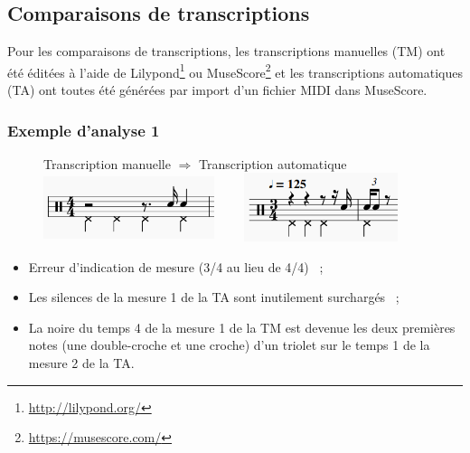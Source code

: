 \subsection*{Comparaisons de transcriptions}
Pour les comparaisons de transcriptions, les transcriptions manuelles (TM) ont
été éditées à l’aide de Lilypond\footnote{\url{http://lilypond.org/}} ou
MuseScore\footnote{\url{https://musescore.com/}} et les transcriptions
automatiques (TA) ont toutes été générées par import d’un fichier MIDI dans
MuseScore.

\subsubsection{Exemple d’analyse 1}
\begin{figure}[h]
\centering
Transcription manuelle $\Rightarrow$ Transcription automatique
\includegraphics[height=20mm, width=50mm]{
z_images/4_experimentations/1_analyses/0_drummer1_session3/1_manuelle.png}
\ \ \ \ 
\includegraphics[height=20mm, width=45mm]{
z_images/4_experimentations/1_analyses/0_drummer1_session3/0_musescore.png}
\end{figure}
\begin{itemize}
	\item Erreur d’indication de mesure (3/4 au lieu de 4/4)~ ;
	\item Les silences de la mesure 1 de la TA sont inutilement surchargés~ ;
	\item La noire du temps 4 de la mesure 1 de la TM est devenue les deux
        premières notes (une double-croche et une croche) d’un triolet sur le
        temps 1 de la mesure 2 de la TA.
\end{itemize}

